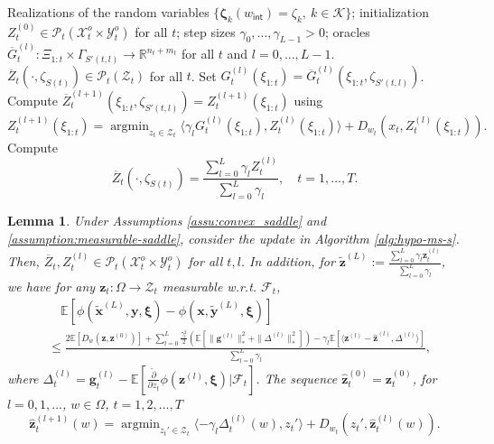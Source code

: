\documentclass[11pt,fullpage,letterpaper]{article}
\newcommand{\mc}{\mathcal}
\newcommand{\mb}{\mathbf}
\newcommand{\R}{\mathbb{R}}
\newcommand{\E}{\mathbb{E}}
\newcommand{\bx}{\boldsymbol{\xi}}
\newcommand{\bz}{\boldsymbol{\zeta}}
\newcommand{\internal}{\mathsf{int}}
\DeclareMathOperator*{\argmin}{argmin}
\newtheorem{lemma}{Lemma}[section]
\begin{document}
\begin{algorithm}
\caption{Hypothetical mirror descent update for \eqref{eq:minmax-online}}\label{alg:hypo-ms-s}
\begin{algorithmic}
\Require Realizations of the random variables $\{\bz_k(w_{\internal})= \zeta_k,~k\in \mc K\}$; initialization $Z^{(0)}_t\in \mc P_t(\mc X^o_t\times \mc Y_t^o)$ for all $t$; step sizes $\gamma_0,\ldots,\gamma_{L-1}>0$; oracles $\overline{G}^{(l)}_t:\Xi_{1:t}\times \Gamma_{S'(t,l)}\to \R^{n_t+m_t}$ for all $t$ and $l=0,\ldots,L-1$. 
\Ensure $\overline{Z}_t(\cdot,\zeta_{S(t)}) \in \mc P_t(\mc Z_t)$ for all $t$.
\State Set $G_t^{(l)}(\xi_{1:t}) = \overline{G}_t^{(l)}(\xi_{1:t},\zeta_{S'(t,l)})$.
\State Compute $\overline{Z}_t^{(l+1)}(\xi_{1:t},\zeta_{S'(t,l)}) = Z_{t}^{(l+1)}(\xi_{1:t})$ using
\begin{equation}\label{eq:MD2}
    Z_{t}^{(l+1)}(\xi_{1:t}) = \argmin_{z_t\in \mc Z_t} \langle \gamma_l G^{(l)}_t(\xi_{1:t}),Z^{(l)}_t(\xi_{1:t}) \rangle+ D_{w_t}(x_t, Z^{(l)}_t(\xi_{1:t})).
\end{equation}
\EndFor
\EndFor
\State 
Compute 
\begin{equation*}
   \overline{Z}_t(\cdot,\zeta_{S(t)})=\frac{\sum_{l=0}^L \gamma_lZ_t^{(l)}}{\sum_{l=0}^L \gamma_l},\quad t=1,\ldots,T. 
\end{equation*}
\end{algorithmic}
\end{algorithm}


\begin{lemma}\label{lm:MD-saddle}
    Under Assumptions \ref{assu:convex_saddle} and \ref{assumption:measurable-saddle}, consider the update in Algorithm \ref{alg:hypo-ms-s}. Then, $\overline{Z}_t,Z_t^{(l)}\in \mc P_t(\mc X_t^{o}\times \mc Y_t^o)$ for all $t,l$. In addition, for $\widetilde{\mb z}^{(L)}:=\frac{\sum_{l=0}^L \gamma_l\mb z_t^{(l)}}{\sum_{l=0}^L \gamma_l}$, we have for any $\mb z_t:\Omega\to \mc Z_t$ measurable w.r.t. $\mc F_t$,
   \begin{align*}
    &\quad \E[\phi(\widetilde{\mb x}^{(L)},\mb y,\bx) -\phi(\mb x,\widetilde{\mb y}^{(L)},\bx) ]\\
    &\leq \frac{2\E[D_{w}(\mb z,\mb z^{(0)})]+
   \sum_{l=0}^L \frac{\gamma_l^2}{2}(\E[\|\mb g^{(l)}\|_*^2 +\|\Delta^{(l)}\|_*^2] )-\gamma_l\E[\langle \mb z^{(l)} - \widehat{\mb z}^{(l)},\Delta^{(l)}\rangle]}{\sum_{l=0}^L \gamma_l},
\end{align*}
   where $\Delta^{(l)}_t = \mb g^{(l)}_t-\E[ \frac{\tilde{\partial}}{\partial z_t}\phi(\mb z^{(l)},\bx)|\mc F_t]$. The sequence $\widehat{\mb z}_t^{(0)} =\mb z_t^{(0)} $, for $l=0,1,\ldots$, $w\in \Omega$, $t=1,2,\ldots,T$
    \begin{displaymath}
            \widehat{\mb z}_t^{(l+1)}(w) = \argmin_{z_t'\in {\mc Z}_t} \langle -\gamma_l\Delta_t^{(l)}(w),z_t'\rangle + D_{w_t}(z_t',\widehat{\mb z}_t^{(l)}(w)). 
        \end{displaymath}

\end{lemma}
\end{document}
